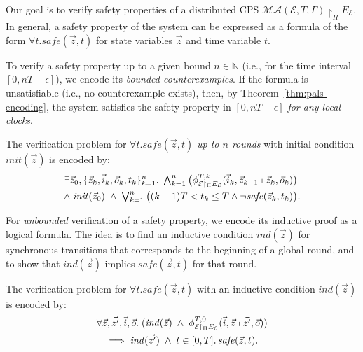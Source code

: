 Our goal is to verify safety properties
of a distributed CPS $\mathcal{MA}(\mathcal{E}, T, \Gamma) \restriction_{\Pi} E_\mathcal{E}$.
In general, a safety property of the system can be expressed as a formula of the form 
$\forall t.  \mathit{safe}(\vec{z},t)$
for  state variables $\vec{z}$ and time variable $t$.


To verify %
a safety property %
up to a given bound $n \in \mathbb{N}$
(i.e., for the time interval $[0,nT - \epsilon]$),
we encode its \emph{bounded counterexamples}. %
If the formula is unsatisfiable (i.e., no counterexample exists), 
then, by Theorem~\ref{thm:pals-encoding},  the system satisfies the safety property in $[0,nT - \epsilon]$
\emph{for any local clocks}.



\begin{definition}
The verification problem for $\forall t.  \mathit{safe}(\vec{z},t)$
\emph{up to $n$ rounds} with  initial condition $\mathit{init}(\vec{z})$
is encoded by:
\begin{align*}
\exists \vec{z}_0, \{\vec{z}_k, \vec{i}_k, \vec{o}_k, t_k\}_{k=1}^{n}.\;
\textstyle\bigwedge_{k=1}^{n}
\big(\phi_{\mathcal{E} \restriction_{\Pi} E_\mathcal{E}}^{T,k}(
	\vec{i}_k, \vec{z}_{k-1}
	\shortmid 
	\vec{z}_{k}, \vec{o}_k)\big)
\phantom{.}
\\
\wedge\;
\mathit{init}(\vec{z}_0)
\;\wedge\;
\textstyle\bigvee_{k=1}^{n}
\big(
(k-1)T < t_{k} \leq T
\wedge
\neg\mathit{safe}(\vec{z}_k, t_{k}) 
\big).
\end{align*}
\end{definition}


For \emph{unbounded} verification of a safety property,
we encode its inductive proof as a logical formula.
The idea is to find an inductive condition $\mathit{ind}(\vec{z})$ 
for synchronous transitions
that corresponds to the beginning of a global round,
and to show that $\mathit{ind}(\vec{z})$ implies %
$\mathit{safe}(\vec{z},t)$ 
for that round.

\begin{definition} 
The  verification problem for $\forall t. \mathit{safe}(\vec{z},t)$
with an inductive condition $\mathit{ind}(\vec{z})$ is encoded  by:
\begin{multline*}
\forall \vec{z}, \vec{z'}, \vec{i}, \vec{o}.\;
(\mathit{ind}(\vec{z})\;\wedge\;\phi_{\mathcal{E} \restriction_{\Pi} E_\mathcal{E}}^{T,0}(\vec{i}, \vec{z}\shortmid \vec{z'}, \vec{o}))
\\
\implies
\mathit{ind}(\vec{z'}) \;\wedge\; t \in [0,T].\,\mathit{safe}(\vec{z},t)
.
\end{multline*}
\end{definition}

